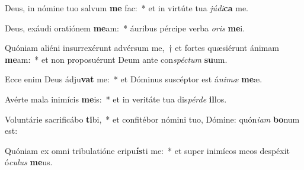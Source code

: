 \item Deus, in nómine tuo salvum \textbf{me} fac:~* et in virtúte tua \textit{jú}\textit{di}\textbf{ca} me.
\item Deus, exáudi oratiónem \textbf{me}am:~* áuribus pércipe verba \textit{o}\textit{ris} \textbf{me}i.
\item Quóniam aliéni insurrexérunt advérsum me,~† et fortes quæsiérunt ánimam \textbf{me}am:~* et non proposuérunt Deum ante con\textit{spéc}\textit{tum} \textbf{su}um.
\item Ecce enim Deus ádju\textbf{vat} me:~* et Dóminus suscéptor est á\textit{ni}\textit{mæ} \textbf{me}æ.
\item Avérte mala inimícis \textbf{me}is:~* et in veritáte tua dis\textit{pér}\textit{de} \textbf{il}los.
\item Voluntárie sacrificábo \textbf{ti}bi,~* et confitébor nómini tuo, Dómine: quón\textit{i}\textit{am} \textbf{bo}num est:
\item Quóniam ex omni tribulatióne eripu\textbf{ís}ti me:~* et super inimícos meos despéxit ó\textit{cu}\textit{lus} \textbf{me}us.
